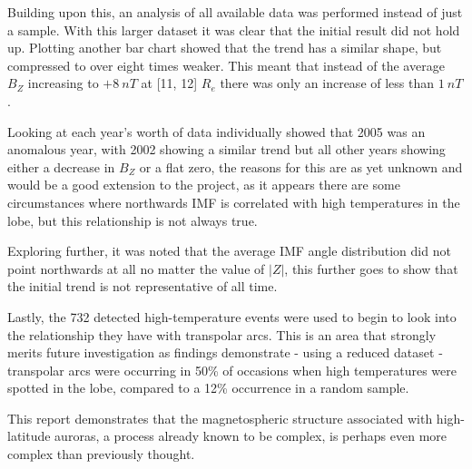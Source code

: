 \documentclass[12pt]{article}
\begin{document}
Building upon this, an analysis of all available data was performed instead of just a sample. With this larger dataset it was clear that the initial result did not hold up. Plotting another bar chart showed that the trend has a similar shape, but compressed to over eight times weaker. This meant that instead of the average $B_Z$ increasing to $+8\ nT$ at [11, 12] $R_e$ there was only an increase of less than $1\ nT$. 

Looking at each year's worth of data individually showed that 2005 was an anomalous year, with 2002 showing a similar trend but all other years showing either a decrease in $B_Z$ or a flat zero, the reasons for this are as yet unknown and would be a good extension to the project, as it appears there are some circumstances where northwards IMF is correlated with high temperatures in the lobe, but this relationship is not always true. 

Exploring further, it was noted that the average IMF angle distribution did not point northwards at all no matter the value of $|Z|$, this further goes to show that the initial trend is not representative of all time.

Lastly, the 732 detected high-temperature events were used to begin to look into the relationship they have with transpolar arcs. This is an area that strongly merits future investigation as findings demonstrate - using a reduced dataset - transpolar arcs were occurring in 50\% of occasions when high temperatures were spotted in the lobe, compared to a 12\% occurrence in a random sample. 

This report demonstrates that the magnetospheric structure associated with high-latitude auroras, a process already known to be complex, is perhaps even more complex than previously thought.

\printbibliography
\end{document}
